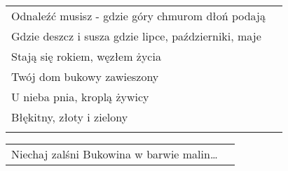 \documentclass[a5paper]{article}
\begin{document}
\noindent
\begin{tabular}{@{}p{8.5cm}p{3cm}@{}}
Odnaleźć musisz - gdzie góry chmurom dłoń podają \\
Gdzie deszcz i susza gdzie lipce, październiki, maje \\
Stają się rokiem, węzłem życia \\
Twój dom bukowy zawieszony \\
U nieba pnia, kroplą żywicy \\
Błękitny, złoty i zielony \\ \\
\end{tabular}

\noindent
\begin{tabular}{@{}p{8.5cm}p{3cm}@{}}
Niechaj zalśni Bukowina w barwie malin…
\end{tabular}
\end{document}

